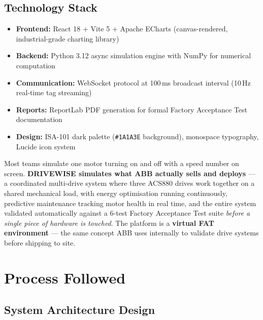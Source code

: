 \documentclass[9pt,a4paper,twocolumn,twoside]{tau-class/tau}
\begin{document}
\subsection{Technology Stack}

\begin{itemize}
    \item \textbf{Frontend:} React 18 + Vite 5 + Apache ECharts (canvas-rendered, industrial-grade charting library)
    \item \textbf{Backend:} Python 3.12 async simulation engine with NumPy for numerical computation
    \item \textbf{Communication:} WebSocket protocol at 100\,ms broadcast interval (10\,Hz real-time tag streaming)
    \item \textbf{Reports:} ReportLab PDF generation for formal Factory Acceptance Test documentation
    \item \textbf{Design:} ISA-101 dark palette (\texttt{\#1A1A3E} background), monospace typography, Lucide icon system
\end{itemize}

\begin{tauenv}[frametitle=Key Innovation — What Separates DRIVEWISE From Every Other Submission]
Most teams simulate one motor turning on and off with a speed number on screen. \textbf{DRIVEWISE simulates what ABB actually sells and deploys} — a coordinated multi-drive system where three ACS880 drives work together on a shared mechanical load, with energy optimisation running continuously, predictive maintenance tracking motor health in real time, and the entire system validated automatically against a 6-test Factory Acceptance Test suite \textit{before a single piece of hardware is touched}. The platform is a \textbf{virtual FAT environment} — the same concept ABB uses internally to validate drive systems before shipping to site.
\end{tauenv}


\section{Process Followed}

\subsection{System Architecture Design}
\end{document}
